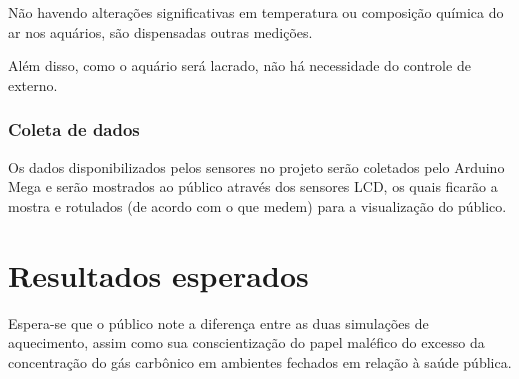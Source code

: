 \documentclass[article,11pt,oneside,a4paper,
	english,	%
	brazil,		%
	sumario=tradicional]{abntex2}
\begin{document}
Não havendo alterações significativas em temperatura ou composição química do ar nos aquários, são dispensadas outras medições.

Além disso, como o aquário será lacrado, não há necessidade do controle de  externo.


\subsubsection{Coleta de dados}

Os dados disponibilizados pelos sensores no projeto serão coletados pelo Arduino Mega e serão mostrados ao público através dos sensores LCD, os quais ficarão a mostra e rotulados (de acordo com o que medem) para a visualização do público.



\section{Resultados esperados}

Espera-se que o público note a diferença entre as duas simulações de aquecimento, assim como sua conscientização do papel maléfico do excesso da concentração do gás carbônico em ambientes fechados em relação à saúde pública.



% 




\postextual




%

%
%
%
%
\end{document}
